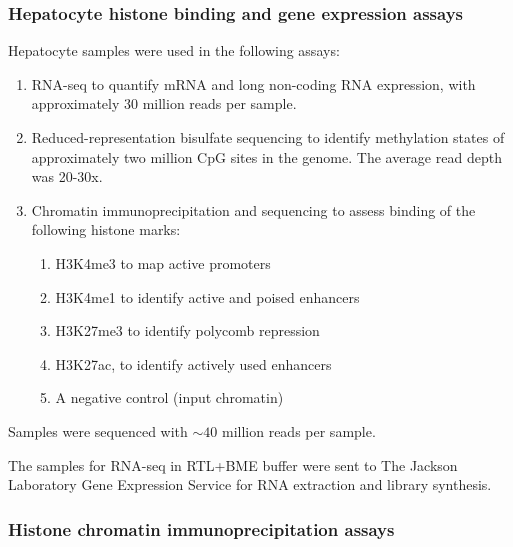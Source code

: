 \documentclass[
  11pt,
]{article}
\providecommand{\tightlist}{%
  \setlength{\itemsep}{0pt}\setlength{\parskip}{0pt}}
\begin{document}
\hypertarget{hepatocyte-histone-binding-and-gene-expression-assays}{%
\subsubsection{Hepatocyte histone binding and gene expression
assays}\label{hepatocyte-histone-binding-and-gene-expression-assays}}

Hepatocyte samples were used in the following assays:

\begin{enumerate}
\def\labelenumi{\arabic{enumi}.}
\tightlist
\item
  RNA-seq to quantify mRNA and long non-coding RNA expression, with
  approximately 30 million reads per sample.
\item
  Reduced-representation bisulfate sequencing to identify methylation
  states of approximately two million CpG sites in the genome. The
  average read depth was 20-30x.
\item
  Chromatin immunoprecipitation and sequencing to assess binding of the
  following histone marks:

  \begin{enumerate}
  \def\labelenumii{\alph{enumii}.}
  \tightlist
  \item
    H3K4me3 to map active promoters
  \item
    H3K4me1 to identify active and poised enhancers
  \item
    H3K27me3 to identify polycomb repression
  \item
    H3K27ac, to identify actively used enhancers
  \item
    A negative control (input chromatin)
  \end{enumerate}
\end{enumerate}

Samples were sequenced with \(\sim40\) million reads per sample.

The samples for RNA-seq in RTL+BME buffer were sent to The Jackson
Laboratory Gene Expression Service for RNA extraction and library
synthesis.

\hypertarget{histone-chromatin-immunoprecipitation-assays}{%
\subsubsection{Histone chromatin immunoprecipitation
assays}\label{histone-chromatin-immunoprecipitation-assays}}
\end{document}
